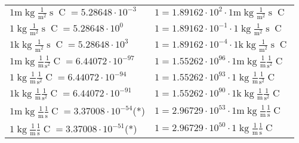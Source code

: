 \begin{center}
\begin{longtable}{l l}
{\color{gray}$1 \bm{\mathrm{ m}}\operatorname{kg}\frac1{\operatorname{m}^2}{\operatorname{s}}{\operatorname{C}}{} = 5.28648\cdot10^{-3} $}   & {\color{gray}$ 1 = 1.89162\cdot10^{2} \cdot 1 \bm{\mathrm{ m}}\operatorname{kg}\frac1{\operatorname{m}^2}{\operatorname{s}}{\operatorname{C}}{}$}  \\
{\color{black}$1 \bm{\mathrm{ }}\operatorname{kg}\frac1{\operatorname{m}^2}{\operatorname{s}}{\operatorname{C}}{} = 5.28648\cdot10^{0} $}   & {\color{black}$ 1 = 1.89162\cdot10^{-1} \cdot 1 \bm{\mathrm{ }}\operatorname{kg}\frac1{\operatorname{m}^2}{\operatorname{s}}{\operatorname{C}}{}$}  \\
{\color{gray}$1 \bm{\mathrm{ k}}\operatorname{kg}\frac1{\operatorname{m}^2}{\operatorname{s}}{\operatorname{C}}{} = 5.28648\cdot10^{3} $}   & {\color{gray}$ 1 = 1.89162\cdot10^{-4} \cdot 1 \bm{\mathrm{ k}}\operatorname{kg}\frac1{\operatorname{m}^2}{\operatorname{s}}{\operatorname{C}}{}$}  \\
{\color{gray}$1 \bm{\mathrm{ m}}\operatorname{kg}\frac1{\operatorname{m}}\frac1{\operatorname{s}^2}{\operatorname{C}}{} = 6.44072\cdot10^{-97} $}   & {\color{gray}$ 1 = 1.55262\cdot10^{96} \cdot 1 \bm{\mathrm{ m}}\operatorname{kg}\frac1{\operatorname{m}}\frac1{\operatorname{s}^2}{\operatorname{C}}{}$}  \\
{\color{black}$1 \bm{\mathrm{ }}\operatorname{kg}\frac1{\operatorname{m}}\frac1{\operatorname{s}^2}{\operatorname{C}}{} = 6.44072\cdot10^{-94} $}   & {\color{black}$ 1 = 1.55262\cdot10^{93} \cdot 1 \bm{\mathrm{ }}\operatorname{kg}\frac1{\operatorname{m}}\frac1{\operatorname{s}^2}{\operatorname{C}}{}$}  \\
{\color{gray}$1 \bm{\mathrm{ k}}\operatorname{kg}\frac1{\operatorname{m}}\frac1{\operatorname{s}^2}{\operatorname{C}}{} = 6.44072\cdot10^{-91} $}   & {\color{gray}$ 1 = 1.55262\cdot10^{90} \cdot 1 \bm{\mathrm{ k}}\operatorname{kg}\frac1{\operatorname{m}}\frac1{\operatorname{s}^2}{\operatorname{C}}{}$}  \\
{\color{gray}$1 \bm{\mathrm{ m}}\operatorname{kg}\frac1{\operatorname{m}}\frac1{\operatorname{s}}{\operatorname{C}}{} = 3.37008\cdot10^{-54} $}\quad(*) & {\color{gray}$ 1 = 2.96729\cdot10^{53} \cdot 1 \bm{\mathrm{ m}}\operatorname{kg}\frac1{\operatorname{m}}\frac1{\operatorname{s}}{\operatorname{C}}{}$}  \\
{\color{black}$1 \bm{\mathrm{ }}\operatorname{kg}\frac1{\operatorname{m}}\frac1{\operatorname{s}}{\operatorname{C}}{} = 3.37008\cdot10^{-51} $}\quad(*) & {\color{black}$ 1 = 2.96729\cdot10^{50} \cdot 1 \bm{\mathrm{ }}\operatorname{kg}\frac1{\operatorname{m}}\frac1{\operatorname{s}}{\operatorname{C}}{}$}  \\

\end{longtable}
\end{center}
